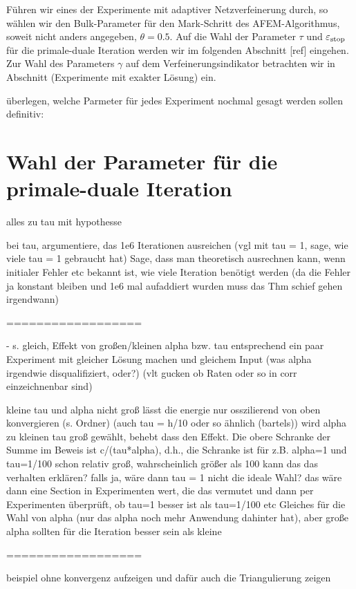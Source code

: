 Führen wir eines der Experimente mit adaptiver Netzverfeinerung durch, so
wählen wir den Bulk-Parameter für den Mark-Schritt des AFEM-Algorithmus, soweit
nicht anders angegeben, $\theta=0.5$.
Auf die Wahl der Parameter $\tau$ und $\varepsilon_{\textup{stop}}$ für die primale-duale
Iteration werden wir im folgenden Abschnitt [ref] eingehen.
Zur Wahl des Parameters $\gamma$ auf dem Verfeinerungsindikator betrachten
wir in Abschnitt (Experimente mit exakter Lösung) ein.

  überlegen, welche Parmeter für jedes Experiment nochmal gesagt werden sollen
  definitiv: 


\section{Wahl der Parameter für die primale-duale Iteration}
alles zu tau mit hypothesse

bei tau, argumentiere, das 1e6 Iterationen ausreichen (vgl mit tau = 1, sage, 
wie viele tau = 1 gebraucht hat) Sage, dass man theoretisch ausrechnen kann,
wenn initialer Fehler etc bekannt ist, wie viele Iteration benötigt werden (da 
die Fehler ja konstant bleiben und 1e6 mal aufaddiert wurden muss das 
Thm schief gehen irgendwann)

==================

  - s. gleich, Effekt von großen/kleinen alpha bzw. tau entsprechend ein
    paar Experiment mit gleicher Lösung machen und gleichem Input (was alpha
    irgendwie disqualifiziert, oder?) (vlt gucken ob Raten oder so in corr
    einzeichnenbar sind)

kleine tau und alpha nicht groß lässt die energie nur osszilierend von oben
konvergieren (s. Ordner) (auch tau = h/10 oder so ähnlich (bartels))
wird alpha zu kleinen tau groß gewählt, behebt dass den Effekt.
Die obere Schranke der Summe im Beweis ist c/(tau*alpha), d.h., die Schranke
ist für z.B. alpha=1 und tau=1/100 schon relativ groß, wahrscheinlich größer
als 100
kann das das verhalten erklären?
falls ja, wäre dann tau = 1 nicht die ideale Wahl?
das wäre dann eine Section in Experimenten wert, die das vermutet und dann per
Experimenten überprüft, ob tau=1 besser ist als tau=1/100 etc
Gleiches für die Wahl von alpha (nur das alpha noch mehr Anwendung dahinter hat),
aber große alpha sollten für die Iteration besser sein als kleine 

==================

beispiel ohne konvergenz aufzeigen und dafür auch die Triangulierung zeigen

